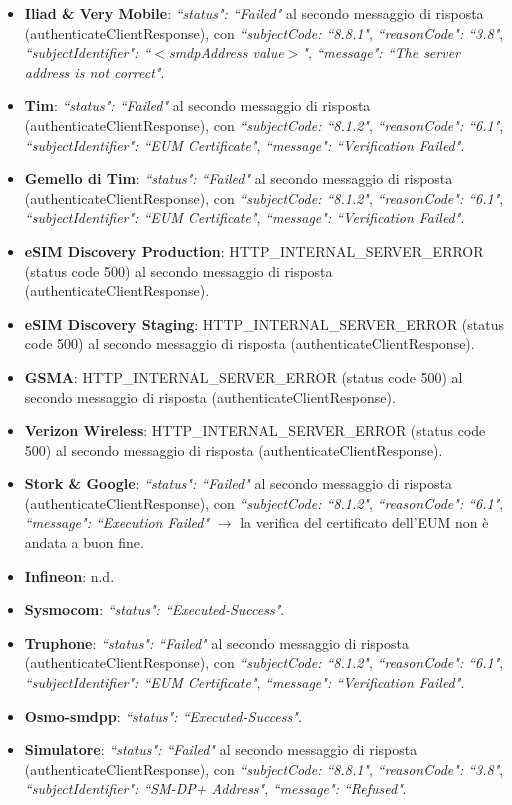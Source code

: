 \documentclass[10pt, oneside]{book}
\begin{document}
\begin{itemize}
\item \textbf{Iliad \& Very Mobile}: \textit{``status": ``Failed"} al secondo messaggio di risposta (authenticateClientResponse), con \textit{``subjectCode: ``8.8.1"}, \textit{``reasonCode": ``3.8"}, \textit{``subjectIdentifier": ``$<$smdpAddress value$>$"}, \textit{``message": ``The server address is not correct"}.
\item \textbf{Tim}: \textit{``status": ``Failed"} al secondo messaggio di risposta (authenticateClientResponse), con \textit{``subjectCode: ``8.1.2"}, \textit{``reasonCode": ``6.1"}, \textit{``subjectIdentifier": ``EUM Certificate"}, \textit{``message": ``Verification Failed"}.
\item \textbf{Gemello di Tim}: \textit{``status": ``Failed"} al secondo messaggio di risposta (authenticateClientResponse), con \textit{``subjectCode: ``8.1.2"}, \textit{``reasonCode": ``6.1"}, \textit{``subjectIdentifier": ``EUM Certificate"}, \textit{``message": ``Verification Failed"}.
\item \textbf{eSIM Discovery Production}: HTTP\_INTERNAL\_SERVER\_ERROR (status code 500) al secondo messaggio di risposta (authenticateClientResponse).
\item \textbf{eSIM Discovery Staging}: HTTP\_INTERNAL\_SERVER\_ERROR (status code 500) al secondo messaggio di risposta (authenticateClientResponse).
\item \textbf{GSMA}: HTTP\_INTERNAL\_SERVER\_ERROR (status code 500) al secondo messaggio di risposta (authenticateClientResponse).
\item \textbf{Verizon Wireless}: HTTP\_INTERNAL\_SERVER\_ERROR (status code 500) al secondo messaggio di risposta (authenticateClientResponse).
\item \textbf{Stork \& Google}: \textit{``status": ``Failed"} al secondo messaggio di risposta (authenticateClientResponse), con \textit{``subjectCode: ``8.1.2"}, \textit{``reasonCode": ``6.1"}, \textit{``message": ``Execution Failed"} $\rightarrow$ la verifica del certificato dell'EUM non è andata a buon fine.
\item \textbf{Infineon}: n.d.
\item \textbf{Sysmocom}: \textit{``status": ``Executed-Success"}.
\item \textbf{Truphone}: \textit{``status": ``Failed"} al secondo messaggio di risposta (authenticateClientResponse), con \textit{``subjectCode: ``8.1.2"}, \textit{``reasonCode": ``6.1"}, \textit{``subjectIdentifier": ``EUM Certificate"}, \textit{``message": ``Verification Failed"}.
\item \textbf{Osmo-smdpp}: \textit{``status": ``Executed-Success"}.
\item \textbf{Simulatore}: \textit{``status": ``Failed"} al secondo messaggio di risposta (authenticateClientResponse), con \textit{``subjectCode: ``8.8.1"}, \textit{``reasonCode": ``3.8"}, \textit{``subjectIdentifier": ``SM-DP+ Address"}, \textit{``message": ``Refused"}.
\end{itemize}
\end{document}
